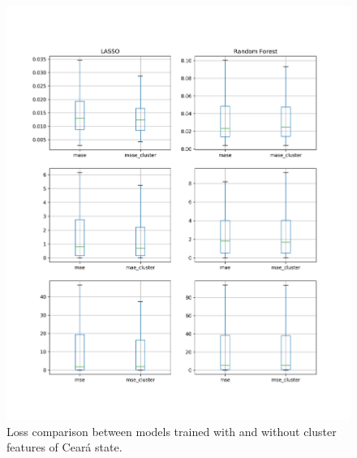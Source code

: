 \documentclass[12pt]{report}
\begin{document}
\begin{figure}
\centering
\includegraphics[width=\textwidth]{compar_fore_cluster_CE.png}
\caption{Loss comparison between models trained with and without cluster features of Ceará state.}
\label{fig:cluster_compar_ce}
\end{figure}
\end{document}
